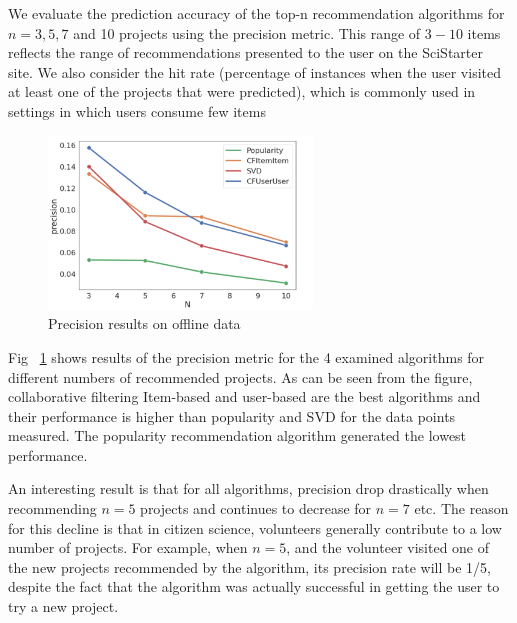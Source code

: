 \documentclass[letterpaper]{article} %
\begin{document}

We evaluate the prediction accuracy of the top-n recommendation algorithms for $n=3, 5, 7$ and 10 projects using the precision metric. This range of $3 - 10$ items reflects the range of recommendations presented to the user on the SciStarter site.
We also consider the hit rate (percentage of instances when the user visited at least one of the projects that were predicted), which is commonly used in settings in which users consume few items~\cite{wang2015recommendation}



\begin{figure}[t]
\centering
\includegraphics[width=7cm]{Figs/Presicion_N.png}
\caption{Precision results on offline data}
\label{fig:offline}
\end{figure}

 Fig ~\ref{fig:offline} shows results of the precision metric for
the 4 examined algorithms for different numbers of recommended projects. As can be seen from the figure,
collaborative filtering  Item-based and user-based are the best
algorithms and their performance is higher than popularity
and SVD for the data points measured. The popularity recommendation algorithm generated the lowest performance.

An interesting result is that for all algorithms, precision
drop drastically when recommending $n=5$
projects and continues to decrease for $n=7$ etc. The reason
for this decline is that in citizen science, volunteers generally
contribute to a low number of projects. For example, when
$n=5$, and the volunteer visited one of the new projects recommended by the algorithm,
its precision rate will be 1/5,
despite the fact that the algorithm was actually successful in
getting the user to try a new project.
\end{document}
